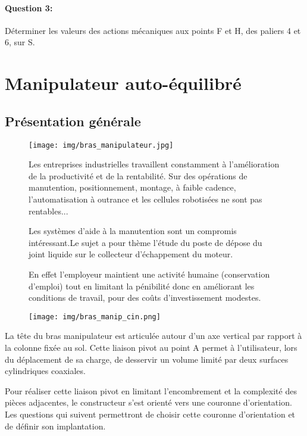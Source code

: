 \paragraph{Question 3:} Déterminer les valeurs des actions mécaniques aux points F et H, des paliers 4 et 6, sur S.

\newpage

\section{Manipulateur auto-équilibré}

\subsection{Présentation générale}

\begin{figure}[!h]
 \begin{minipage}{0.3\linewidth}
  \centering\texttt{[image: img/bras\_manipulateur.jpg]}
 \end{minipage}
 \hfill
 \begin{minipage}{0.69\linewidth}
Les entreprises industrielles travaillent constamment à l'amélioration de la productivité et de la rentabilité. Sur des opérations de manutention, positionnement, montage, à faible cadence, l'automatisation à outrance et les cellules robotisées ne sont pas rentables...

Les systèmes d'aide à la manutention sont un compromis intéressant.Le sujet a pour thème l'étude du poste de dépose du joint liquide sur le collecteur d'échappement du moteur.

En effet l'employeur maintient une activité humaine (conservation d'emploi) tout en limitant la pénibilité donc en améliorant les conditions de travail, pour des coûts d'investissement modestes.
 \end{minipage}
\end{figure}

\begin{figure}[!h]
  \centering\texttt{[image: img/bras\_manip\_cin.png]}
\end{figure}

La tête du bras manipulateur est articulée autour d'un axe vertical par rapport à la colonne fixée au sol. Cette liaison pivot au point A permet à l'utilisateur, lors du déplacement de sa charge, de desservir un volume limité par deux surfaces cylindriques coaxiales.

Pour réaliser cette liaison pivot en limitant l'encombrement et la complexité des pièces adjacentes, le constructeur s'est orienté vers une couronne d'orientation. Les questions qui suivent permettront de choisir cette couronne d'orientation et de définir son implantation.

